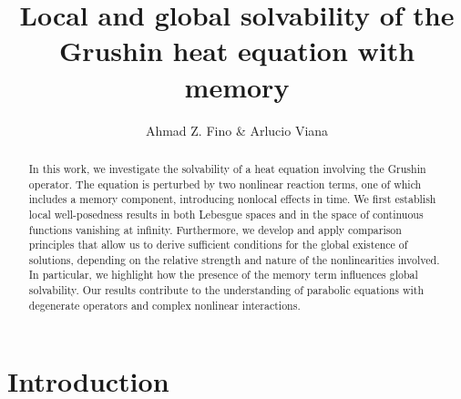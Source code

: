 \documentclass[a4,psfig,english,12pt,epsf,portrait]{article}
\title{\bf{Local and global solvability of the Grushin heat equation with memory}}
\author{Ahmad Z. Fino \& Arlucio Viana}
\date{}
\numberwithin{equation}{section}
\begin{document}
\maketitle





\begin{abstract} 
	In this work, we investigate the solvability of a heat equation involving the Grushin operator. The equation is perturbed by two nonlinear reaction terms, one of which includes a memory component, introducing nonlocal effects in time. We first establish local well-posedness results in both Lebesgue spaces and in the space of continuous functions vanishing at infinity. Furthermore, we develop and apply comparison principles that allow us to derive sufficient conditions for the global existence of solutions, depending on the relative strength and nature of the nonlinearities involved. In particular, we highlight how the presence of the memory term influences global solvability. Our results contribute to the understanding of parabolic equations with degenerate operators and complex nonlinear interactions.
	
	
	
\end{abstract}

\section{Introduction}
\end{document}
